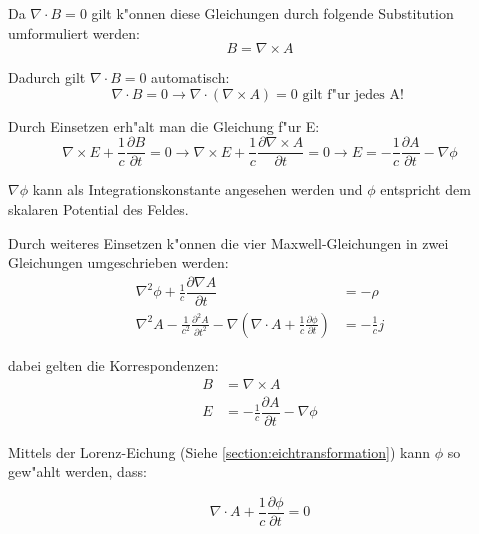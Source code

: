 Da $\nabla \cdot B = 0 $ gilt k"onnen diese Gleichungen durch folgende Substitution umformuliert werden:
\begin{equation}
B = \nabla\times A 
\end{equation}

Dadurch gilt $\nabla \cdot B = 0 $ automatisch:
\begin{equation}
\nabla \cdot B = 0 \rightarrow \nabla \cdot ( \nabla\times A ) = 0 \text{ gilt f"ur jedes A! }
\end{equation}

Durch Einsetzen erh"alt man die Gleichung f"ur E:
\begin{equation}
\nabla\times E + \frac{1}{c} \frac{\partial B }{\partial t} = 0
\rightarrow \nabla\times E + \frac{1}{c} \frac{\partial \nabla\times A }{\partial t} = 0 \rightarrow E = -\frac{1}{c} \dfrac{\partial A}{\partial t} - \nabla \phi
\end{equation}

$\nabla \phi$ kann als Integrationskonstante angesehen werden und $\phi$ entspricht dem skalaren Potential des Feldes.

Durch weiteres Einsetzen k"onnen die vier Maxwell-Gleichungen in zwei Gleichungen umgeschrieben werden:
\begin{equation}
\begin{split}
 \nabla^2 \phi + \frac{1}{c} \dfrac{\partial \nabla A}{\partial t} &= -\rho \\
 \nabla^2 A - \frac{1}{c^2} \frac{\partial^2 A }{\partial t^2} - \nabla \left( \nabla \cdot A + \frac{1}{c} \frac{\partial \phi }{\partial t} \right) &= - \frac{1}{c} j
\end{split}
\end{equation}

dabei gelten die Korrespondenzen:
\begin{equation}
\begin{split}
B &= \nabla\times A \\
E &= -\frac{1}{c} \dfrac{\partial A}{\partial t} - \nabla \phi
\end{split}
\end{equation}

Mittels der Lorenz-Eichung (Siehe \ref{section:eichtransformation}) kann $\phi$ so gew"ahlt werden, dass:

\begin{equation}
\nabla \cdot A + \frac{1}{c} \frac{\partial \phi }{\partial t} = 0
\end{equation}

